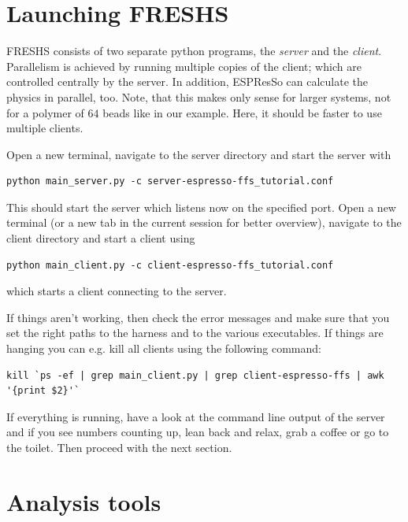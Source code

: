 \documentclass[a4paper,oneside]{article}
\newenvironment{mylisting}
{\begin{list}{}{\setlength{\leftmargin}{1em}}\item\scriptsize\bfseries}
{\end{list}}
\begin{document}
\section{Launching FRESHS}

FRESHS consists of two separate python programs, the {\it server} and the {\it client}.  Parallelism is achieved by running multiple copies of the client; which are controlled centrally by the server. In addition, ESPResSo can calculate the physics in parallel, too. Note, that this makes only sense for larger systems, not for a polymer of $64$ beads like in our example. Here, it should be faster to use multiple clients.

Open a new terminal, navigate to the server directory and start the server with
\begin{mylisting}
\begin{verbatim}
python main_server.py -c server-espresso-ffs_tutorial.conf
\end{verbatim}
\end{mylisting}
This should start the server which listens now on the specified port. Open a new terminal (or a new tab in the current session for better overview), navigate to the client directory and start a client using
\begin{mylisting}
\begin{verbatim}
python main_client.py -c client-espresso-ffs_tutorial.conf
\end{verbatim}
\end{mylisting}
which starts a client connecting to the server.

If things aren't working, then check the error messages and make sure that you set the right paths to the harness and to the various executables.  If things are hanging you can e.g. kill all clients using the following command:
\begin{mylisting}
\begin{verbatim}
kill `ps -ef | grep main_client.py | grep client-espresso-ffs | awk '{print $2}'`
\end{verbatim}
\end{mylisting}

If everything is running, have a look at the command line output of the server and if you see numbers counting up, lean back and relax, grab a coffee or go to the toilet. Then proceed with the next section.

\section{Analysis tools}
\end{document}
